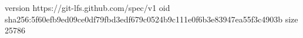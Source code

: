 version https://git-lfs.github.com/spec/v1
oid sha256:5f60efb9ed09ce0df79fbd3edf679c0524b9c111e0f6b3e83947ea55f3c4903b
size 25786

